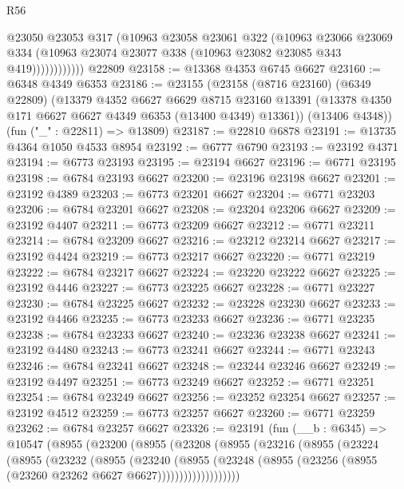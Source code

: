 \begin{lexlean}{R56}
\begin{coremodule}
                    @23050
                    @23053
                    @317
                    (@10963
                      @23058
                      @23061
                      @322
                      (@10963
                        @23066
                        @23069
                        @334
                        (@10963 @23074 @23077 @338 (@10963 @23082 @23085 @343 @419))))))))))))
    @22809
@23158 := @13368 @4353 @6745 @6627
@23160 := @6348 @4349 @6353
@23186 := @23155
    (@23158
      (@8716 @23160)
      (@6349 @22809)
      (@13379
        @4352
        @6627
        @6629
        @8715
        @23160
        @13391
        (@13378 @4350 @171 @6627 @6627 @4349 @6353 (@13400 @4349) @13361))
      (@13406 @4348))
    (fun ("_" : @22811) => @13809)
@23187 := @22810 @6878
@23191 := @13735 @4364 @1050 @4533 @8954
@23192 := @6777 @6790
@23193 := @23192 @4371
@23194 := @6773 @23193
@23195 := @23194 @6627
@23196 := @6771 @23195
@23198 := @6784 @23193 @6627
@23200 := @23196 @23198 @6627
@23201 := @23192 @4389
@23203 := @6773 @23201 @6627
@23204 := @6771 @23203
@23206 := @6784 @23201 @6627
@23208 := @23204 @23206 @6627
@23209 := @23192 @4407
@23211 := @6773 @23209 @6627
@23212 := @6771 @23211
@23214 := @6784 @23209 @6627
@23216 := @23212 @23214 @6627
@23217 := @23192 @4424
@23219 := @6773 @23217 @6627
@23220 := @6771 @23219
@23222 := @6784 @23217 @6627
@23224 := @23220 @23222 @6627
@23225 := @23192 @4446
@23227 := @6773 @23225 @6627
@23228 := @6771 @23227
@23230 := @6784 @23225 @6627
@23232 := @23228 @23230 @6627
@23233 := @23192 @4466
@23235 := @6773 @23233 @6627
@23236 := @6771 @23235
@23238 := @6784 @23233 @6627
@23240 := @23236 @23238 @6627
@23241 := @23192 @4480
@23243 := @6773 @23241 @6627
@23244 := @6771 @23243
@23246 := @6784 @23241 @6627
@23248 := @23244 @23246 @6627
@23249 := @23192 @4497
@23251 := @6773 @23249 @6627
@23252 := @6771 @23251
@23254 := @6784 @23249 @6627
@23256 := @23252 @23254 @6627
@23257 := @23192 @4512
@23259 := @6773 @23257 @6627
@23260 := @6771 @23259
@23262 := @6784 @23257 @6627
@23326 := @23191
    (fun (__b : @6345) =>
    @10547
      (@8955
        (@23200
          (@8955
            (@23208
              (@8955
                (@23216
                  (@8955
                    (@23224
                      (@8955
                        (@23232
                          (@8955
                            (@23240
                              (@8955
                                (@23248
                                  (@8955
                                    (@23256 (@8955 (@23260 @23262 @6627 @6627)))))))))))))))))))

\end{coremodule}
\end{lexlean}

